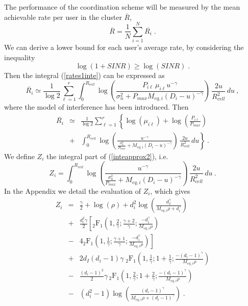 The performance of the coordination scheme will be measured by the mean achievable rate per user in the cluster $\overline{R}$,
\begin{equation}
 \overline{R}=\frac{1}{N} \sum_{i=1}^{N} \overline{R_i}\;.
\end{equation}
We can derive a lower bound for each user's average rate, by considering the inequality 
\begin{equation}
   \log(1+SINR)\geq\log(SINR)\;.
\end{equation} 
Then the integral (\ref{rates1inte}) can be expressed as
\begin{equation}
      \overline{R_i}\simeq\frac{1}{\log 2 }\sum_{\ell=1}^{r}
          \int_0^{R_{cell}}\log\left(\frac{P_{i\ell} \, \mu_{i\ell}u^{-\gamma}}{\sigma_n^2+P_{max}M_{eq,i}(D_i-u)^{-\gamma}}\right)\,\frac{2u}{R_{cell}^2}\,du\:, \label{inteapprox1}
\end{equation}
where the model of interference has been introduced. Then
\begin{eqnarray}
      \overline{R_i}&\!\!\!\simeq\!\!\!&\frac{1}{\log 2 }\sum_{\ell=1}^{r}\left\{
          \log\left(\mu_{i\ell}\right)+\log\left(\frac{P_{i\ell}}{P_{max}}\right)\right.\nonumber\\ 
      &\!\!\!+\!\!\!&\left. \int_{0}^{R_{cell}}\log\left(\frac{u^{-\gamma}}{\frac{\sigma_n^2}{P_{max}}+M_{eq, i}(D_i-u)^{-\gamma}}\right)\,\frac{2u}{R_{cell}^2}\,du\right\}\:.\label{inteapprox2}
\end{eqnarray}
We define $Z_i$ the integral part of (\ref{inteapprox2}), i.e.
\begin{equation}
      Z_i=\int_{0}^{R_{cell}}\log\left(\frac{u^{-\gamma}}{\frac{\sigma_n^2}{P_{max}}+M_{eq, i}(D_i-u)^{-\gamma}}\right)\,\frac{2u}{R_{cell}^2}\,du\:.\label{Z_i}
\end{equation}
In the Appendix we detail the evaluation of $Z_i$, which gives
\begin{eqnarray}
	Z_i&=&
          \frac{\gamma}{2}+\log(\rho)+ d_i^2 \log\left(\frac{d_I^\gamma}{M_{eq,i}\rho+d_i^\gamma}\right) \nonumber\\
          &+&\frac{d_i^2\gamma}{2}\left[\mbox{$_2$F$_1$}\left(1,\frac{2}{\gamma};\frac{\gamma+2}{\gamma};\frac{-d_i^\gamma}{M_{eq,i}\rho}\right)\right.\nonumber\\
         &-&\left.4\mbox{$_2$F$_1$}\left(1,\frac{1}{\gamma};\frac{\gamma+1}{\gamma};\frac{-d_i^\gamma}{M_{eq,i}\rho}\right)\right] 
          \nonumber\\
          &+&2d_I(d_i-1)\gamma \;\mbox{$_2$F$_1$}\left(1,\frac{1}{\gamma};1+\frac{1}{\gamma};\frac{-(d_i-1)^\gamma}{M_{eq,i}\rho}\right)\nonumber\\
             &-&\frac{(d_i-1)^2}{2}\gamma\, \mbox{$_2$F$_1$}\left(1,\frac{2}{\gamma};1+\frac{2}{\gamma};\frac{-(d_i-1)^\gamma}{M_{eq,i}\rho}\right)\nonumber\\
             &-& (d_i^2-1) \log\left(\frac{(d_i-1)^\gamma}{M_{eq,i}\rho+(d_i-1)^\gamma}\right) \;.\label{Zi}
\end{eqnarray}
